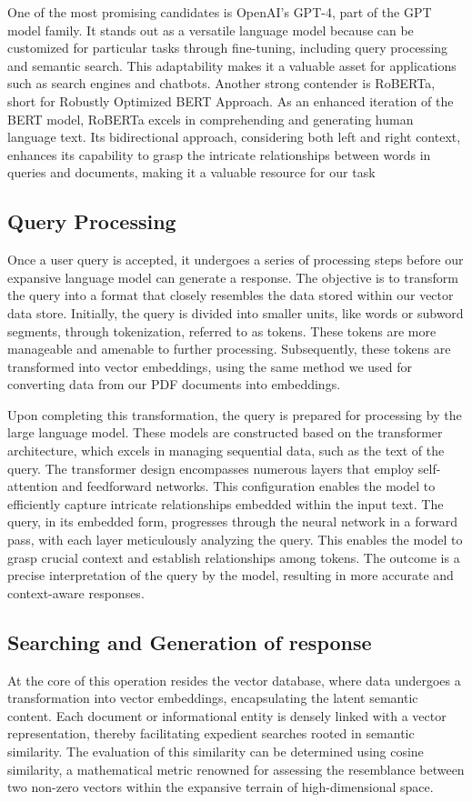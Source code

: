 \documentclass[conference]{IEEEtran}
\begin{document}
One of the most promising candidates is OpenAI's GPT-4, part of the GPT model family. It stands out as a versatile language model because can be customized for particular tasks through fine-tuning, including query processing and semantic search. This adaptability makes it a valuable asset for applications such as search engines and chatbots. Another strong contender is RoBERTa, short for Robustly Optimized BERT Approach. As an enhanced iteration of the BERT model, RoBERTa excels in comprehending and generating human language text. Its bidirectional approach, considering both left and right context, enhances its capability to grasp the intricate relationships between words in queries and documents, making it a valuable resource for our task

\subsection{Query Processing}
Once a user query is accepted, it undergoes a series of processing steps before our expansive language model can generate a response. The objective is to transform the query into a format that closely resembles the data stored within our vector data store. Initially, the query is divided into smaller units, like words or subword segments, through tokenization, referred to as tokens. These tokens are more manageable and amenable to further processing. Subsequently, these tokens are transformed into vector embeddings, using the same method we used for  converting data from our PDF documents into embeddings.

Upon completing this transformation, the query is prepared for processing by the large language model. These models are constructed based on the transformer architecture, which excels in managing sequential data, such as the text of the query. The transformer design encompasses numerous layers that employ self-attention and feedforward networks. This configuration enables the model to efficiently capture intricate relationships embedded within the input text. The query, in its embedded form, progresses through the neural network in a forward pass, with each layer meticulously analyzing the query. This enables the model to grasp crucial context and establish relationships among tokens. The outcome is a precise interpretation of the query by the model, resulting in more accurate and context-aware responses.

\subsection{Searching and Generation of response}
At the core of this operation resides the vector database, where data undergoes a transformation into vector embeddings, encapsulating the latent semantic content. Each document or informational entity is densely linked with a vector representation, thereby facilitating expedient searches rooted in semantic similarity. The evaluation of this similarity can be determined using cosine similarity, a mathematical metric renowned for assessing the resemblance between two non-zero vectors within the expansive terrain of high-dimensional space.
\end{document}
